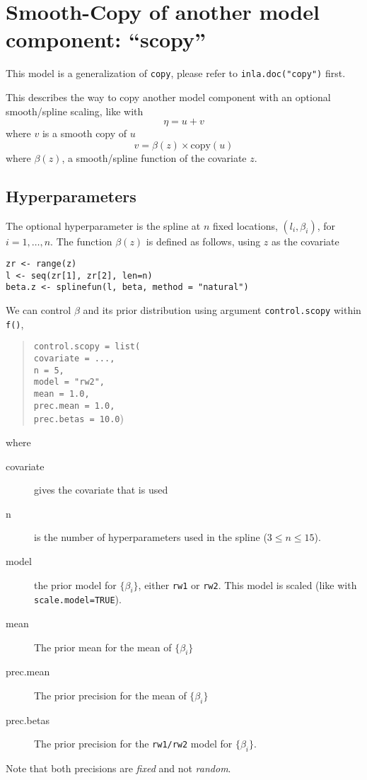 \documentclass[a4paper,11pt]{article}
\begin{document}
\section*{Smooth-Copy of another model component: ``scopy''}

This model is a generalization of \texttt{copy}, please refer to
\texttt{inla.doc("copy")} first.

This describes the way to copy another model component with an
optional smooth/spline scaling, like with
\begin{displaymath}
    \eta = u + v
\end{displaymath}
where $v$ is a smooth copy of $u$
\begin{displaymath}
    v = \beta(z)\times\text{copy}(u)
\end{displaymath}
where $\beta(z)$, a smooth/spline function of the covariate $z$.

\subsection*{Hyperparameters}

The optional hyperparameter is the spline at $n$ fixed locations,
$(l_i, \beta_i)$, for $i=1, \ldots, n$. The function $\beta(z)$ is
defined as follows, using $z$ as the covariate
\begin{verbatim}
zr <- range(z)
l <- seq(zr[1], zr[2], len=n)
beta.z <- splinefun(l, beta, method = "natural")
\end{verbatim}

We can control $\beta$ and its prior distribution using argument
\texttt{control.scopy} within \texttt{f()},
\begin{quote}
    \texttt{control.scopy = list(\\
        covariate = ..., \\
        n = 5, \\
        model = "rw2",\\
        mean = 1.0, \\
        prec.mean =  1.0,  \\
        prec.betas =  10.0})
\end{quote}
where
\begin{description}
\item[covariate] gives the covariate that is used
\item[n] is the number of hyperparameters used in the spline ($3 \leq
    n \leq 15$).
\item[model] the prior model for $\{\beta_i\}$, either \texttt{rw1} or
    \texttt{rw2}. This model is scaled (like with
    \texttt{scale.model=TRUE}).
\item[mean] The prior mean for the mean of $\{\beta_i\}$
\item[prec.mean] The prior precision for the mean of $\{\beta_i\}$
\item[prec.betas] The prior precision for the \texttt{rw1/rw2} model
    for $\{\beta_i\}$.
\end{description}
Note that both precisions are \emph{fixed} and not \emph{random}.
\end{document}
